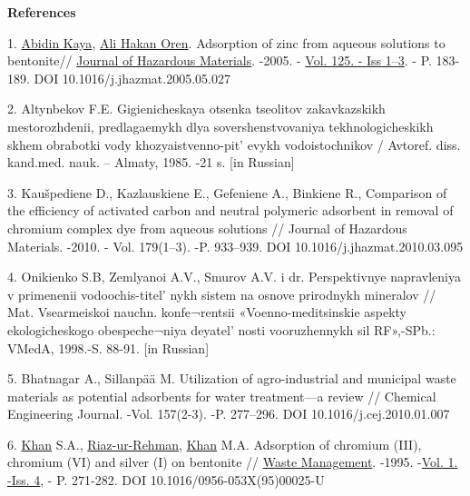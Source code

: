 \begin{center}
{\bfseries References}
\end{center}

\begin{references}
1.
\href{https://www.sciencedirect.com/science/article/abs/pii/S0304389405002669\#!}{Abidin
Kaya},
\href{https://www.sciencedirect.com/science/article/abs/pii/S0304389405002669\#!}{Ali
Hakan Oren}. Adsorption of zinc from aqueous solutions to bentonite//
\href{https://www.sciencedirect.com/science/journal/03043894}{Journal of
Hazardous Materials}. -2005. -
\href{https://www.sciencedirect.com/science/journal/03043894/125/1}{Vol.
125. - Iss 1--3}. - P. 183-189. DOI 10.1016/j.jhazmat.2005.05.027

2. Altynbekov F.E. Gigienicheskaya otsenka tseolitov zakavkazskikh
mestorozhdenii, predlagaemykh dlya sovershenstvovaniya
tekhnologicheskikh skhem obrabotki vody
khozyaistvenno-pit' evykh vodoistochnikov / Avtoref.
diss. kand.med. nauk. -- Almaty, 1985. -21 s. {[}in Russian{]}

3. Kaušpediene D., Kazlauskiene E., Gefeniene A., Binkiene R.,
Comparison of the efficiency of activated carbon and neutral polymeric
adsorbent in removal of chromium complex dye from aqueous solutions //
Journal of Hazardous Materials. -2010. - Vol. 179(1--3). -P. 933--939.
DOI 10.1016/j.jhazmat.2010.03.095

4. Onikienko S.B, Zemlyanoi A.V., Smurov A.V. i dr. Perspektivnye
napravleniya v primenenii vodoochis-titel' nykh sistem na
osnove prirodnykh mineralov // Mat. Vsearmeiskoi nauchn. konfe¬rentsii
«Voenno-meditsinskie aspekty ekologicheskogo obespeche¬niya
deyatel' nosti vooruzhennykh sil RF»,-SPb.: \\VMedA,
1998.-S. 88-91. {[}in Russian{]}

5. Bhatnagar A., Sillanpää M. Utilization of agro-industrial and
municipal waste materials as potential adsorbents for water
treatment---a review // Chemical Engineering Journal. -Vol. 157(2-3).
-P. 277--296. DOI 10.1016/j.cej.2010.01.007

6.
\href{https://www.sciencedirect.com/science/article/pii/0956053X9500025U\#!}{Khan}
S.A.,
\href{https://www.sciencedirect.com/science/article/pii/0956053X9500025U\#!}{Riaz-ur-Rehman},
\href{https://www.sciencedirect.com/science/article/pii/0956053X9500025U\#!}{Khan}
M.A. Adsorption of chromium (III), chromium (VI) and silver (I) on
bentonite //
\href{https://www.sciencedirect.com/science/journal/0956053X}{Waste
Management}. -1995.
-\href{https://www.sciencedirect.com/science/journal/0956053X/15/4}{Vol.
1. -Iss. 4}, - P. 271-282. DOI 10.1016/0956-053X(95)00025-U


\end{references}
